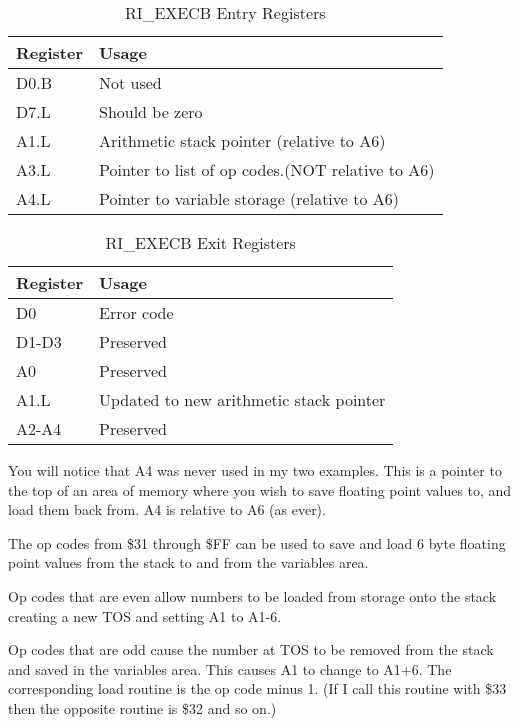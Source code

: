 \begin{table}[htbp]
\centering
\begin{tabular}{l l}
\toprule
\textbf{Register} & \textbf{Usage} \\
\midrule
%
D0.B & Not used \\
D7.L & Should be zero \\
A1.L & Arithmetic stack pointer (relative to A6) \\
A3.L & Pointer to list of op codes.(NOT relative to A6) \\
A4.L & Pointer to variable storage (relative to A6) \\
%
\bottomrule
\end{tabular}
\caption{RI\_EXECB Entry Registers}
\label{tab:RIEXECBEntryRegisters}
\end{table}

\begin{table}[htbp]
\centering
\begin{tabular}{l l}
\toprule
\textbf{Register} & \textbf{Usage} \\
\midrule
%
D0    & Error code \\
D1-D3 & Preserved \\
A0    & Preserved \\
A1.L  & Updated to new arithmetic stack pointer \\
A2-A4 & Preserved \\
%
\bottomrule
\end{tabular}
\caption{RI\_EXECB Exit Registers}
\label{tab:RIEXECBExitRegisters}
\end{table}

You will notice that A4 was never used in my two examples. This is a
    pointer to the top of an area of memory where you wish to save floating
    point values to, and load them back from. A4 is relative to A6 (as
    ever).

The op codes from \$31 through \$FF can be used to save and load 6
    byte floating point values from the stack to and from the variables
    area.

Op codes that are even allow numbers to be loaded from storage onto
    the stack creating a new TOS and setting A1 to A1-{}6.

Op codes that are odd cause the number at TOS to be removed from the
    stack and saved in the variables area. This causes A1 to change to A1+6.
    The corresponding load routine is the op code minus 1. (If I call this
    routine with \$33 then the opposite routine is \$32 and so on.)

